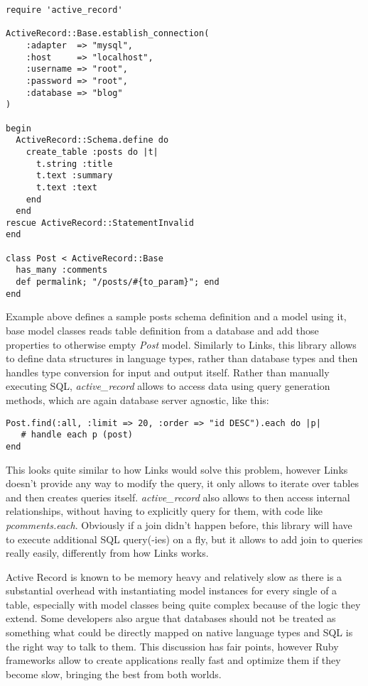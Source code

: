 \begin{codelisting}
\begin{verbatim}
require 'active_record'

ActiveRecord::Base.establish_connection(
    :adapter  => "mysql",
    :host     => "localhost",
    :username => "root",
    :password => "root",
    :database => "blog"
)

begin
  ActiveRecord::Schema.define do
    create_table :posts do |t|
      t.string :title
      t.text :summary
      t.text :text
    end
  end
rescue ActiveRecord::StatementInvalid
end

class Post < ActiveRecord::Base
  has_many :comments
  def permalink; "/posts/#{to_param}"; end
end
\end{verbatim}
\end{codelisting}

Example above defines a sample posts schema definition and a model using it, base model classes reads table definition from a database and add those properties to otherwise empty \textit{Post} model. Similarly to Links, this library allows to define data structures in language types, rather than database types and then handles type conversion for input and output itself. Rather than manually executing SQL, \textit{active\_record} allows to access data using query generation methods, which are again database server agnostic, like this:

\begin{codelisting}
\begin{verbatim}
Post.find(:all, :limit => 20, :order => "id DESC").each do |p|
   # handle each p (post)
end
\end{verbatim}
\end{codelisting}

This looks quite similar to how Links would solve this problem, however Links doesn't provide any way to modify the query, it only allows to iterate over tables and then creates queries itself. \textit{active\_record} also allows to then access internal relationships, without having to explicitly query for them, with code like \textit{    pcomments.each}. Obviously if a join didn't happen before, this library will have to execute additional SQL query(-ies) on a fly, but it allows to add join to queries really easily, differently from how Links works.

Active Record is known to be memory heavy and relatively slow as there is a substantial overhead with instantiating model instances for every single of a table, especially with model classes being quite complex because of the logic they extend. Some developers also argue that databases should not be treated as something what could be directly mapped on native language types and SQL is the right way to talk to them. This discussion has fair points, however Ruby frameworks allow to create applications really fast and optimize them if they become slow, bringing the best from both worlds.

